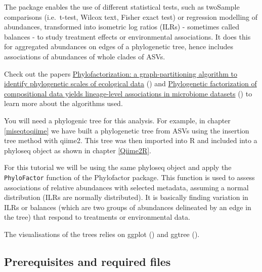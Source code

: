 \documentclass[
]{book}
\begin{document}
The package enables the use of different statistical tests, such as twoSample comparisons (i.e.~t-test, Wilcox text, Fisher exact test) or regression modelling of abundances, transformed into isometric log ratios (ILRs) - sometimes called balances - to study treatment effects or environmental associations. It does this for aggregated abundances on edges of a phylogenetic tree, hence includes associations of abundances of whole clades of ASVs.

Check out the papers \href{https://www.biorxiv.org/content/10.1101/235341v2}{Phylofactorization: a graph-partitioning algorithm to identify phylogenetic scales of ecological data} (\citet{Washburne2019a}) and \href{https://peerj.com/articles/2969/}{Phylogenetic factorization of compositional data yields lineage-level associations in microbiome datasets} (\citet{Washburne2017}) to learn more about the algorithms used.

You will need a phylogenic tree for this analysis. For example, in chapter \ref{miseqtoqiime} we have built a phylogenetic tree from ASVs using the insertion tree method with qiime2. This tree was then imported into R and included into a phyloseq object as shown in chapter \ref{Qiime2R}.

For this tutorial we will be using the same phyloseq object and apply the \texttt{PhyloFactor} function of the Phylofactor package. This function is used to assess associations of relative abundances with selected metadata, assuming a normal distribution (ILRs are normally distributed). It is basically finding variation in ILRs or balances (which are two groups of abundances delineated by an edge in the tree) that respond to treatments or environmental data.

The visualisations of the trees relies on ggplot (\citet{Wickham2016a}) and ggtree (\citet{Yu2017}).

\hypertarget{prerequisites-and-required-files-1}{%
\subsection{Prerequisites and required files}\label{prerequisites-and-required-files-1}}
\end{document}
